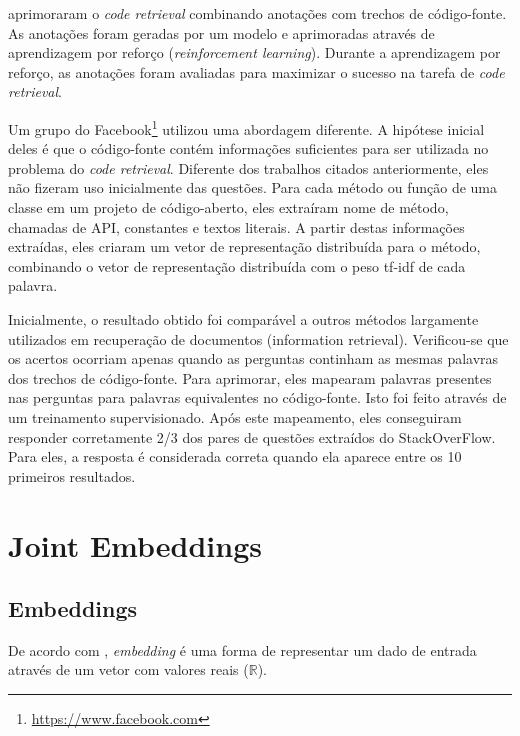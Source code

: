\cite{Yao-coacor:2019} aprimoraram o \textit{code retrieval} combinando anotações com trechos de código-fonte. As anotações foram geradas por um modelo e aprimoradas através de aprendizagem por reforço (\textit{reinforcement learning}). Durante a aprendizagem por reforço, as anotações foram avaliadas para maximizar o sucesso na tarefa de \textit{code retrieval}.

Um grupo do Facebook\footnote{\url{https://www.facebook.com}}\citep{Sachdev-neural-code-search:2018} utilizou uma abordagem diferente. A hipótese inicial deles é que o código-fonte contém informações suficientes para ser utilizada no problema do \textit{code retrieval}. Diferente dos trabalhos citados anteriormente, eles não fizeram uso inicialmente das questões. Para cada método ou função de uma classe em um projeto de código-aberto, eles extraíram nome de método, chamadas de API, constantes e textos literais. A partir destas informações extraídas, eles criaram um vetor de representação distribuída para o método, combinando o vetor de representação distribuída com o peso \acrshort{tf-idf} de cada palavra. 

Inicialmente, o resultado obtido foi comparável a outros métodos largamente utilizados em recuperação de documentos (information retrieval). Verificou-se que os acertos ocorriam apenas quando as perguntas continham as mesmas palavras dos trechos de código-fonte. Para aprimorar, eles mapearam palavras presentes nas perguntas para palavras equivalentes no código-fonte. Isto foi feito através de um treinamento supervisionado. Após este mapeamento, eles conseguiram responder corretamente 2/3 dos pares de questões extraídos do StackOverFlow. Para eles, a resposta é considerada correta quando ela aparece entre os 10 primeiros resultados.

\section{Joint Embeddings}

\subsection{Embeddings}

De acordo com \cite{cambronero-deep-learning-code-search:2019}, \textit{embedding} é uma forma de representar um dado de entrada através de um vetor com valores reais ($\mathbb{R}$).